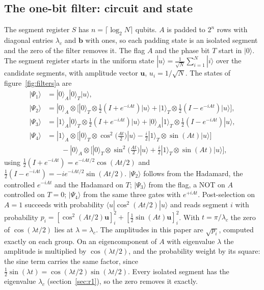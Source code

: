 \documentclass[11pt,a4paper]{article}
\newcommand{\gss}[1]{{\color{teal} #1}}
\begin{document}
\subsection{The one-bit filter: circuit and state}\label{sec:m:onebit}
The segment register $S$ has $n=\lceil\log_2N\rceil$ qubits. $A$ is padded to $2^n$ rows with
diagonal entries $\lambda_c$ and $\mathbf{b}$ with ones, so each padding state is an isolated
segment and the zero of the filter removes it. The flag $A$ and the phase bit $T$ start in $|0\rangle$. \gss{The segment register starts in the uniform state $|u\rangle=\frac{1}{\sqrt N}\sum_{i=1}^{N}|i\rangle$ over the candidate segments, with amplitude vector $\mathbf{u}$, $u_i=1/\sqrt N$.}
The states of figure~\ref{fig:filters}a are
\begin{align}
|\Psi_1\rangle&=|0\rangle_A|0\rangle_T|u\rangle,\\
|\Psi_2\rangle&=|0\rangle_A\otimes\Big[|0\rangle_T\otimes\tfrac12(I+e^{-iAt})|u\rangle+|1\rangle_T\otimes\tfrac12(I-e^{-iAt})|u\rangle\Big],\\
|\Psi_3\rangle&=|1\rangle_A|0\rangle_T\otimes\tfrac12(I+e^{-iAt})|u\rangle+|0\rangle_A|1\rangle_T\otimes\tfrac12(I-e^{-iAt})|u\rangle,\\
|\Psi_4\rangle&=|1\rangle_A\otimes\Big[|0\rangle_T\otimes\cos^2\!\big(\tfrac{At}{2}\big)|u\rangle-\tfrac{i}{2}|1\rangle_T\otimes\sin(At)|u\rangle\Big]\nonumber\\
&\qquad-|0\rangle_A\otimes\Big[|0\rangle_T\otimes\sin^2\!\big(\tfrac{At}{2}\big)|u\rangle+\tfrac{i}{2}|1\rangle_T\otimes\sin(At)|u\rangle\Big],
\end{align}
using $\tfrac12(I+e^{-iAt})=e^{-iAt/2}\cos(At/2)$ and $\tfrac12(I-e^{-iAt})=-ie^{-iAt/2}\sin(At/2)$.
$|\Psi_2\rangle$ follows from the Hadamard, the controlled $e^{-iAt}$ and the Hadamard on $T$;
$|\Psi_3\rangle$ from the flag, a NOT on $A$ controlled on $T=0$; $|\Psi_4\rangle$ from the same
three gates with $e^{+iAt}$. Post-selection on $A=1$ succeeds with probability
$\langle u|\cos^2(At/2)|u\rangle$ and reads segment $i$ with probability
$p_i=[\cos^2(At/2)\mathbf{u}]_i^2+[\tfrac12\sin(At)\mathbf{u}]_i^2$. With $t=\pi/\lambda_c$ the zero
of $\cos(\lambda t/2)$ lies at $\lambda=\lambda_c$. The amplitudes in this paper are $\sqrt{p_i}$,
computed exactly on each group. \gss{On an eigencomponent of $A$ with eigenvalue $\lambda$ the amplitude is multiplied by $\cos(\lambda t/2)$, and the probability weight by its square: the sine term carries the same factor, since $\tfrac12\sin(\lambda t)=\cos(\lambda t/2)\sin(\lambda t/2)$. Every isolated segment has the eigenvalue $\lambda_c$ (section~\ref{sec:r1}), so the zero removes it exactly.}
\end{document}
